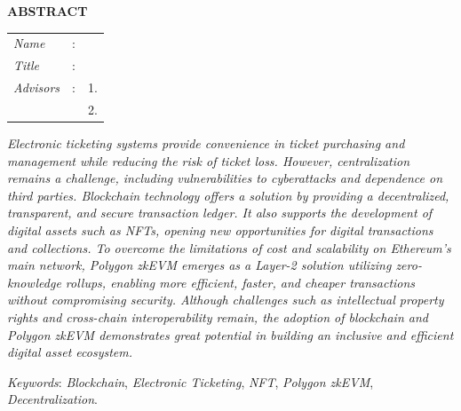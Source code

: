 \begin{center}
  \large\textbf{ABSTRACT}
\end{center}


\vspace{2ex}

\begingroup
\setlength{\tabcolsep}{0pt}

\noindent
\begin{tabularx}{\textwidth}{l >{\centering}m{3em} X}
  \emph{Name}     & : & \name{}         \\

  \emph{Title}    & : & \engtatitle{}   \\

  \emph{Advisors} & : & 1. \advisor{}   \\
                  &   & 2. \coadvisor{} \\
\end{tabularx}
\endgroup

\emph{Electronic ticketing systems provide convenience in ticket purchasing and management while reducing the risk of ticket loss. However, centralization remains a challenge, including vulnerabilities to cyberattacks and dependence on third parties. Blockchain technology offers a solution by providing a decentralized, transparent, and secure transaction ledger. It also supports the development of digital assets such as NFTs, opening new opportunities for digital transactions and collections. To overcome the limitations of cost and scalability on Ethereum’s main network, Polygon zkEVM emerges as a Layer-2 solution utilizing zero-knowledge rollups, enabling more efficient, faster, and cheaper transactions without compromising security. Although challenges such as intellectual property rights and cross-chain interoperability remain, the adoption of blockchain and Polygon zkEVM demonstrates great potential in building an inclusive and efficient digital asset ecosystem.}

\emph{Keywords}: \emph{Blockchain}, \emph{Electronic Ticketing}, \emph{NFT}, \emph{Polygon
  zkEVM}, \emph{Decentralization}.
